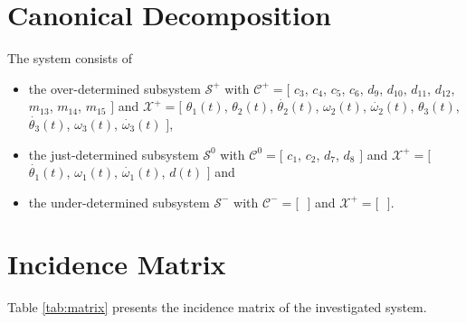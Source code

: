 \documentclass[a4,11pt]{article}
\begin{document}
\section{Canonical Decomposition}The system consists of
\begin{itemize}	\item the over-determined subsystem $\mathcal{S}^+$ with $\mathcal{C}^+ = [$ $c_3$, $c_4$, $c_5$, $c_6$, $d_9$, $d_{10}$, $d_{11}$, $d_{12}$, $m_{13}$, $m_{14}$, $m_{15} $ $]$ and $\mathcal{X}^+ = [$ $\theta_1\left(t\right)$, $\theta_2\left(t\right)$, $\dot{\theta_2}\left(t\right)$, $\omega_2\left(t\right)$, $\dot{\omega_2}\left(t\right)$, $\theta_3\left(t\right)$, $\dot{\theta_3}\left(t\right)$, $\omega_3\left(t\right)$, $\dot{\omega_3}\left(t\right) $ $]$,
	\item the just-determined subsystem $\mathcal{S}^0$ with $\mathcal{C}^0 = [$ $c_1$, $c_2$, $d_7$, $d_8 $ $]$ and $\mathcal{X}^+ = [$ $\dot{\theta_1}\left(t\right)$, $\omega_1\left(t\right)$, $\dot{\omega_1}\left(t\right)$, $d\left(t\right) $ $]$ and
	\item the under-determined subsystem $\mathcal{S}^-$ with $\mathcal{C}^- = [$ $ $ $]$ and $\mathcal{X}^+ = [$ $ $ $]$.
\end{itemize}
\section{Incidence Matrix}
Table \ref{tab:matrix} presents the incidence matrix of the investigated system.\setlength\tabcolsep{2mm}
\end{document}
